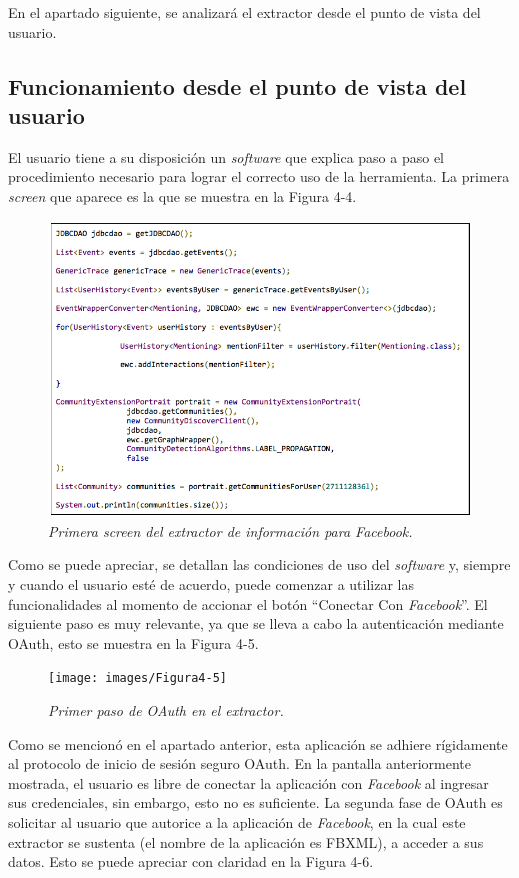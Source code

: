 En el apartado siguiente, se analizará el extractor desde el punto de vista del usuario.

\subsection{Funcionamiento desde el punto de vista del usuario}

El usuario tiene a su disposición un \textit{software} que explica paso a paso el procedimiento necesario para lograr el correcto uso de la herramienta. La primera \textit{screen} que aparece es la que se muestra en la Figura 4-4.

\begin{figure}[h]
	\centering
	\includegraphics[scale=.7]{images/Figura4-4}
	\caption{\em Primera screen del extractor de información para Facebook.}
	\label{fig:ext-im4}
\end{figure}

Como se puede apreciar, se detallan las condiciones de uso del \textit{software} y, siempre y cuando el usuario esté de acuerdo, puede comenzar a utilizar las funcionalidades al momento de accionar el botón “Conectar Con \textit{Facebook}”. El siguiente paso es muy relevante, ya que se lleva a cabo la autenticación mediante OAuth, esto se muestra en la Figura 4-5.

\begin{figure}[h]
	\centering
	\texttt{[image: images/Figura4-5]}
	\caption{\em Primer paso de OAuth en el extractor.}
	\label{fig:ext-im5}
\end{figure}

Como se mencionó en el apartado anterior, esta aplicación se adhiere rígidamente al protocolo de inicio de sesión seguro OAuth. En la pantalla anteriormente mostrada, el usuario es libre de conectar la aplicación con \textit{Facebook} al ingresar sus credenciales, sin embargo, esto no es suficiente.
La segunda fase de OAuth es solicitar al usuario que autorice a la aplicación de \textit{Facebook}, en la cual este extractor se sustenta (el nombre de la aplicación es FBXML), a acceder a sus datos. Esto se puede apreciar con claridad en la Figura 4-6.

